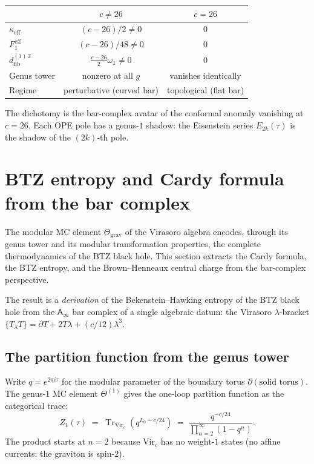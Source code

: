 \documentclass[11pt]{article}
\newcommand{\Ainf}{\mathsf{A}_{\infty}}
\newcommand{\Tr}{\operatorname{Tr}}
\newcommand{\dfib}{d_{\mathrm{fib}}}
\begin{document}
\begin{center}
\renewcommand{\arraystretch}{1.2}
\begin{tabular}{@{}lcc@{}}
& $c \neq 26$ & $c = 26$ \\
\hline
$\kappa_{\mathrm{eff}}$ & $(c-26)/2 \neq 0$ & $0$ \\[3pt]
$F_1^{\mathrm{eff}}$ & $(c-26)/48 \neq 0$ & $0$ \\[3pt]
$\dfib^{(1)\,2}$ & $\frac{c-26}{2}\omega_1 \neq 0$ & $0$ \\[3pt]
Genus tower & nonzero at all $g$ & vanishes identically \\[3pt]
Regime & perturbative (curved bar) & topological (flat bar)
\end{tabular}
\end{center}

\noindent
The dichotomy is the bar-complex avatar of the conformal anomaly
vanishing at $c = 26$.  Each OPE pole has a genus-$1$ shadow:
the Eisenstein series $E_{2k}(\tau)$ is the shadow of the
$(2k)$-th pole.


\section{BTZ entropy and Cardy formula from the bar complex}
\label{sec:btz-entropy-cardy}

The modular MC element $\Theta_{\mathrm{grav}}$ of the Virasoro
algebra encodes, through its genus tower and its modular
transformation properties, the complete thermodynamics of the
BTZ black hole.  This section extracts the Cardy formula, the
BTZ entropy, and the Brown--Henneaux central charge from the
bar-complex perspective.

The result is a \emph{derivation} of the Bekenstein--Hawking
entropy of the BTZ black hole from the $\Ainf$ bar complex of
a single algebraic datum: the Virasoro $\lambda$-bracket
$\{T_\lambda T\} = \partial T + 2T\lambda + (c/12)\lambda^3$.

\subsection{The partition function from the genus tower}
\label{subsec:btz-partition}

Write $q = e^{2\pi i\tau}$ for the modular parameter of the
boundary torus $\partial(\text{solid torus})$.  The genus-$1$
MC element $\Theta^{(1)}$ gives the one-loop partition function
as the categorical trace:
\begin{equation}\label{eq:btz-Z1}
Z_1(\tau)
\;=\;
\Tr_{\mathrm{Vir}_c}\!\left(q^{L_0 - c/24}\right)
\;=\;
\frac{q^{-c/24}}{\prod_{n=2}^{\infty}(1-q^n)}.
\end{equation}
The product starts at $n=2$ because $\mathrm{Vir}_c$ has no
weight-$1$ states (no affine currents: the graviton is spin-$2$).
\end{document}
